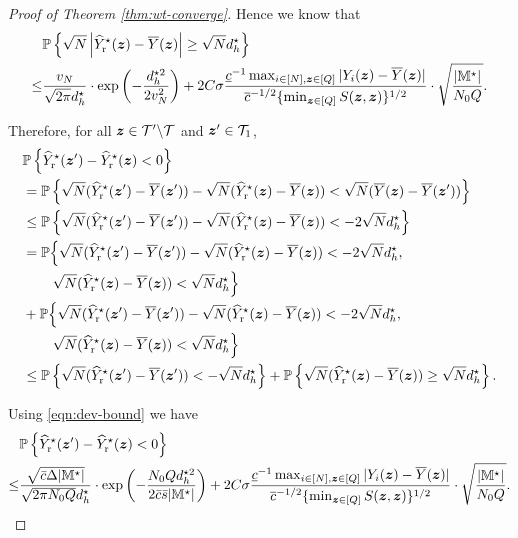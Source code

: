 \documentclass[12pt]{article}
\begin{document}
\begin{proof}[Proof of Theorem \ref{thm:wt-converge}]
Hence we know that
\begin{align}\label{eqn:dev-bound}
       &{\mathbb{P}}\left\{\sqrt{N}\left|{\widehat{Y}}^\star_{\operatorname{r}}({\boldsymbol{z}}) - \overline{Y}({\boldsymbol{z}})\right|\ge {\sqrt{N}d_h^\star} \right\}\notag\\
   \le    &\frac{v_N}{\sqrt{2\pi }d_h^\star}\cdot \exp\left(-\frac{ d_h^{\star 2}}{2v_N^2}\right) + 2C\sigma   \frac{ \underline{c}^{-1} \max_{i\in[N],{\boldsymbol{z}}\in[Q]}|Y_i({\boldsymbol{z}})-\overline{Y}({\boldsymbol{z}})|}{ {\overline{c}^{-1/2} \{\min_{{\boldsymbol{z}}\in[Q]} S({\boldsymbol{z}},{\boldsymbol{z}})}\}^{1/2}}\cdot \sqrt{\frac{|{\mathbb{M}}^\star|}{N_0Q}}.
\end{align}

Therefore, for all ${\boldsymbol{z}}\in{\mathcal{T}}'\backslash{\mathcal{T}}$ and ${\boldsymbol{z}}'\in{\mathcal{T}}_{1}$,
\begin{align*}
    &{\mathbb{P}}\left\{{\widehat{Y}}^\star_{\operatorname{r}}({\boldsymbol{z}}') - {\widehat{Y}}^\star_{\operatorname{r}}({\boldsymbol{z}})<0\right\} \\
    &= {\mathbb{P}}\left\{\sqrt{N}({\widehat{Y}}^\star_{\operatorname{r}}({\boldsymbol{z}}') - \overline{Y}({\boldsymbol{z}}')) - \sqrt{N}({\widehat{Y}}^\star_{\operatorname{r}}({\boldsymbol{z}}) - \overline{Y}({\boldsymbol{z}}))<\sqrt{N}(\overline{Y}({\boldsymbol{z}}) - \overline{Y}({\boldsymbol{z}}'))\right\} \\
    & \le {\mathbb{P}}\left\{\sqrt{N}({\widehat{Y}}^\star_{\operatorname{r}}({\boldsymbol{z}}') - \overline{Y}({\boldsymbol{z}}')) - \sqrt{N}({\widehat{Y}}^\star_{\operatorname{r}}({\boldsymbol{z}}) - \overline{Y}({\boldsymbol{z}}))<-2\sqrt{N}d_h^\star\right\} \\
    & = {\mathbb{P}}\Big\{\sqrt{N}({\widehat{Y}}^\star_{\operatorname{r}}({\boldsymbol{z}}') - \overline{Y}({\boldsymbol{z}}')) - \sqrt{N}({\widehat{Y}}^\star_{\operatorname{r}}({\boldsymbol{z}}) - \overline{Y}({\boldsymbol{z}}))<-2\sqrt{N}d_h^\star, \\
    &\phantom{hello}\sqrt{N}({\widehat{Y}}^\star_{\operatorname{r}}({\boldsymbol{z}}) - \overline{Y}({\boldsymbol{z}}))< {\sqrt{N}d_h^\star}\Big\} \\
    & + {\mathbb{P}}\Big\{\sqrt{N}({\widehat{Y}}^\star_{\operatorname{r}}({\boldsymbol{z}}') - \overline{Y}({\boldsymbol{z}}')) - \sqrt{N}({\widehat{Y}}^\star_{\operatorname{r}}({\boldsymbol{z}}) - \overline{Y}({\boldsymbol{z}}))<-2\sqrt{N}d_h^\star, \\
    &\phantom{hello}\sqrt{N}({\widehat{Y}}^\star_{\operatorname{r}}({\boldsymbol{z}}) - \overline{Y}({\boldsymbol{z}}))< {\sqrt{N}d_h^\star} \Big\} \\
    & \le {\mathbb{P}}\left\{\sqrt{N}({\widehat{Y}}^\star_{\operatorname{r}}({\boldsymbol{z}}') - \overline{Y}({\boldsymbol{z}}')) < - {\sqrt{N}d_h^\star} \right\}
     + {\mathbb{P}}\left\{\sqrt{N}({\widehat{Y}}^\star_{\operatorname{r}}({\boldsymbol{z}}) - \overline{Y}({\boldsymbol{z}}))\ge{\sqrt{N}d_h^\star}\right\}.
\end{align*}

Using \eqref{eqn:dev-bound} we have
\begin{align*}
    &{\mathbb{P}}\left\{{\widehat{Y}}^\star_{\operatorname{r}}({\boldsymbol{z}}') - {\widehat{Y}}^\star_{\operatorname{r}}({\boldsymbol{z}}) < 0\right\} \\
    \le& \frac{\sqrt{\bar{c}\Delta|{\mathbb{M}}^\star|}}{\sqrt{2\pi N_0Q }d_h^\star}\cdot \exp\left(-\frac{ N_0Q d_h^{\star 2}}{2\bar{c}\bar{s}|{\mathbb{M}}^\star|}\right) + 2C\sigma   \frac{ \underline{c}^{-1} \max_{i\in[N],{\boldsymbol{z}}\in[Q]}|Y_i({\boldsymbol{z}})-\overline{Y}({\boldsymbol{z}})|}{ {\overline{c}^{-1/2} \{\min_{{\boldsymbol{z}}\in[Q]} S({\boldsymbol{z}},{\boldsymbol{z}})}\}^{1/2}}\cdot \sqrt{\frac{|{\mathbb{M}}^\star|}{N_0Q}}.
\end{align*}


\end{proof}
\end{document}
